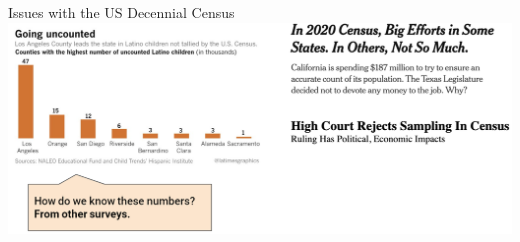 \documentclass[aspectratio=169]{../latex_main/tntbeamer}  %
\begin{document}
	
	\begin{frame}{Issues with the US Decennial Census}
	    \includegraphics[scale=.4]{Bild8}
	\end{frame}
	
\end{document}
